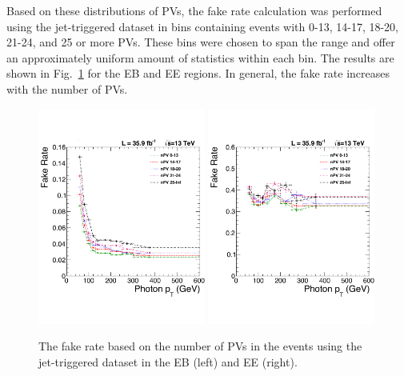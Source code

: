 Based on these distributions of PVs, the fake rate calculation was performed using the jet-triggered dataset in bins containing events with 0-13, 14-17, 18-20, 21-24, and 25 or more PVs. These bins were chosen to span the range and offer an approximately uniform amount of statistics within each bin. The results are shown in Fig.~\ref{fig:fr_pileup} for the EB and EE regions. In general, the fake rate increases with the number of PVs.

\begin{figure}[!htbp]
  \centering
  \includegraphics[width=0.49\textwidth]{figures/pileup2016CompEB}
  \includegraphics[width=0.49\textwidth]{figures/pileup2016CompEE}
  \caption{The fake rate based on the number of PVs in the events using the jet-triggered dataset in the EB (left) and EE (right).}
  \label{fig:fr_pileup}
\end{figure}

